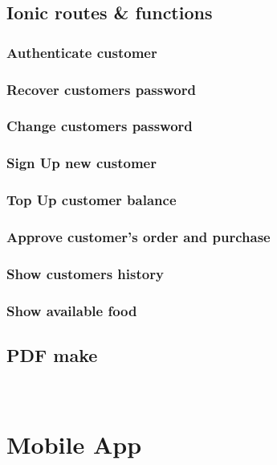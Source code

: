 	\subsection{Ionic routes \& functions}
		\subsubsection{Authenticate customer}
		\subsubsection{Recover customers password}
		\subsubsection{Change customers password}
		\subsubsection{Sign Up new customer}
		\subsubsection{Top Up customer balance}
		\subsubsection{Approve customer's order and purchase}
		\subsubsection{Show customers history}
		\subsubsection{Show available food}
	
	

\subsection{PDF make}

~\cite{PDF_Make_module}



  \section{Mobile App}

